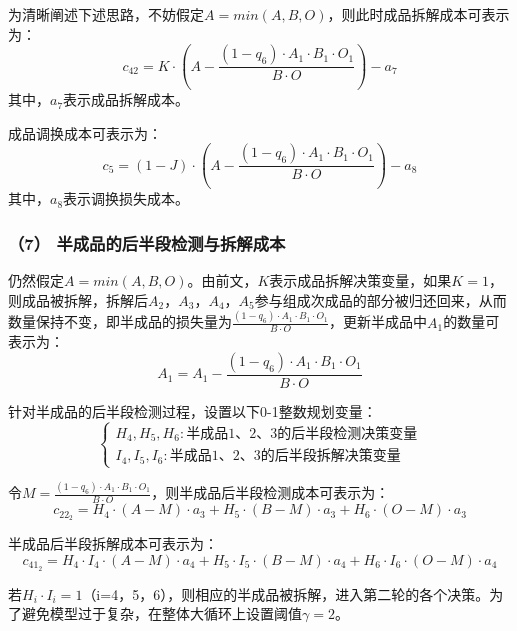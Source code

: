 \documentclass[withoutpreface,bwprint]{cumcmthesis} %
\begin{document}
为清晰阐述下述思路，不妨假定$A=min(A,B,O)$，则此时成品拆解成本可表示为：
\begin{equation}
	c_{42}=K \cdot\left(A-\frac{\left(1-q_6\right) \cdot A_1 \cdot B_1 \cdot O_1}{B \cdot O}\right)-a_7
\end{equation}
其中，$a_7$表示成品拆解成本。

成品调换成本可表示为：
\begin{equation}
	c_{5}=(1 - J) \cdot\left(A-\frac{\left(1-q_6\right) \cdot A_1 \cdot B_1 \cdot O_1}{B \cdot O}\right)-a_8
\end{equation}
其中，$a_8$表示调换损失成本。

\subsubsection*{（7） 半成品的后半段检测与拆解成本}
仍然假定$A=min(A,B,O)$。由前文，$K$表示成品拆解决策变量，如果$K=1$，则成品被拆解，拆解后$A_2$，$A_3$，$A_4$，$A_5$参与组成次成品的部分被归还回来，从而数量保持不变，即半成品的损失量为$\frac{\left(1-q_6\right) \cdot A_1 \cdot B_1 \cdot O_1}{B \cdot O}$，更新半成品中$A_1$的数量可表示为：
\begin{equation}
	A_1=A_1-\frac{\left(1-q_6\right) \cdot A_1 \cdot B_1 \cdot O_1}{B \cdot O}
\end{equation}

针对半成品的后半段检测过程，设置以下0-1整数规划变量：
\begin{equation*}
	\left\{\begin{array}{l}
		H_4, H_5, H_6: \text{半成品1、2、3的后半段检测决策变量}\\
		I_4, I_5, I_6:\text{半成品1、2、3的后半段拆解决策变量}
	\end{array}\right.
\end{equation*}

令$M=\frac{\left(1-q_6\right) \cdot A_1 \cdot B_1 \cdot O_1}{B \cdot O}$，则半成品后半段检测成本可表示为：
\begin{equation}
	c_{22_2}=H_4 \cdot(A-M) \cdot a_3+H_5 \cdot(B-M) \cdot a_3+H_6 \cdot(O-M) \cdot a_3
\end{equation}

半成品后半段拆解成本可表示为：
\begin{equation}
	c_{41_2}=H_4 \cdot I_4 \cdot(A-M) \cdot a_4+H_5 \cdot I_5 \cdot(B-M) \cdot a_4+H_6 \cdot I_6 \cdot(O-M) \cdot a_4
\end{equation}

若$H_i\cdot I_i=1$（i=4，5，6），则相应的半成品被拆解，进入第二轮的各个决策。为了避免模型过于复杂，在整体大循环上设置阈值$\gamma = 2$。
\end{document}
